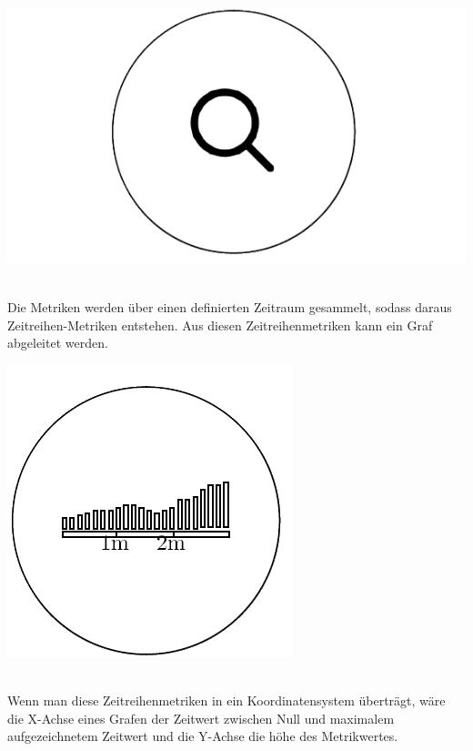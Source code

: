 \documentclass[a4paper,10pt]{scrartcl}
\begin{document}
\begin{minipage}{\linewidth}
  \includegraphics[scale=.3]{img/Datenaggregation/LupeNew.png} 
\end{minipage} \\

Die Metriken werden über einen definierten Zeitraum gesammelt, sodass daraus Zeitreihen-Metriken entstehen. Aus diesen Zeitreihenmetriken kann ein Graf abgeleitet werden.\\

\begin{minipage}{\linewidth}
  \includegraphics[scale=.3]{img/Datenaggregation/GrafAggregationNew.png}
\end{minipage} \\

Wenn man diese Zeitreihenmetriken in ein Koordinatensystem überträgt, wäre die X-Achse eines Grafen der Zeitwert zwischen Null und maximalem aufgezeichnetem Zeitwert und die Y-Achse die höhe des Metrikwertes. \\
\end{document}
